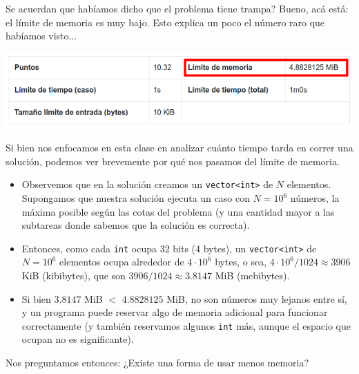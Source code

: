 \documentclass{beamer}
\begin{document}
    \begin{frame}[noframenumbering]
        Se acuerdan que habíamos dicho que el problema tiene trampa? \pause Bueno, acá está: el límite de memoria es muy bajo. \pause Esto explica un poco el número raro que habíamos visto... \pause

        \begin{center}
            \includegraphics[width=.6\linewidth]{./ou_ml.png}
        \end{center} \pause

        Si bien nos enfocamos en esta clase en analizar cuánto tiempo tarda en correr una solución, podemos ver brevemente por qué nos pasamos del límite de memoria.
    \end{frame}

    \begin{frame}[noframenumbering]
        \setlength{\leftmargini}{12pt}
        \begin{itemize}
            \item Observemos que en la solución creamos un \texttt{vector<int>} de $N$ elementos. \pause Supongamos que nuestra solución ejecuta un caso con $N = 10^6$ números, la máxima posible según las cotas del problema (y una cantidad mayor a las subtareas donde sabemos que la solución es correcta). \pause

            \item Entonces, como cada \texttt{int} ocupa 32 bits (4 bytes), un \texttt{vector<int>} de $N = 10^6$ elementos ocupa alrededor de $4 \cdot 10^6$ bytes, o sea, $4 \cdot 10^6 / 1024 \approx 3906$ KiB (kibibytes), que son $3906 / 1024 \approx 3.8147$ MiB (mebibytes). \pause

            \item Si bien $3.8147$ MiB $<$ $4.8828125$ MiB, no son números muy lejanos entre sí, y un programa puede reservar algo de memoria adicional para funcionar correctamente (y también reservamos algunos \texttt{int} más, aunque el espacio que ocupan no es significante).
        \end{itemize} \pause

        Nos preguntamos entonces: ¿Existe una forma de usar menos memoria?
    \end{frame}
\end{document}
